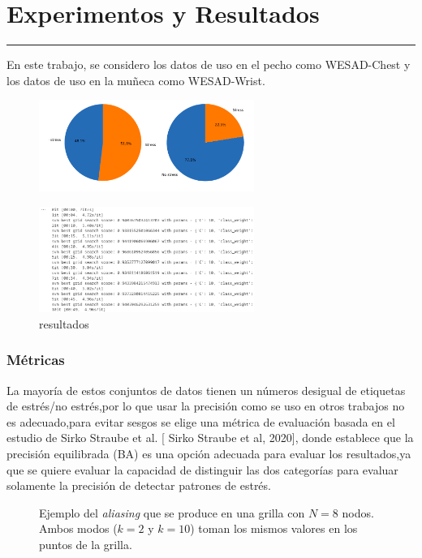 \chapter{Experimentos y Resultados}
\hrule \bigskip \vspace*{1cm}

En este trabajo, se considero  los datos de uso en el pecho como WESAD-Chest y los datos de uso en la muñeca como WESAD-Wrist.


\begin{figure}[h]
    \centering
    \includegraphics[width=7cm]{Graficos/stress.png}
    \label{fig:enter-label}
\end{figure}



\begin{figure}[h]
    \centering
    \includegraphics[width=7cm]{Graficos/capturaresutado.png}
    \caption{resultados}
    \label{fig:enter-label}
\end{figure}


\subsection{Métricas}

 La mayoría de estos conjuntos de datos tienen un  números desigual de etiquetas de estrés/no estrés,por lo que usar la precisión como se uso en otros trabajos no es adecuado,para evitar sesgos  se elige una métrica de evaluación basada en el estudio  de   Sirko Straube et al. [ Sirko Straube et al, 2020], donde establece que la precisión equilibrada (BA)  es una opción adecuada para evaluar los resultados,ya que se quiere evaluar la capacidad de   distinguir las dos categorías para evaluar solamente  la precisión de detectar patrones de estrés.


 

\begin{figure}[!tb] 
 \centering

 \caption{Ejemplo del \emph{aliasing} que se produce en una grilla con $N = 8$ nodos. Ambos modos
          ($k = 2$ y $k = 10$) toman los mismos valores en los puntos de la grilla.} \label{fig-2}
\end{figure}
